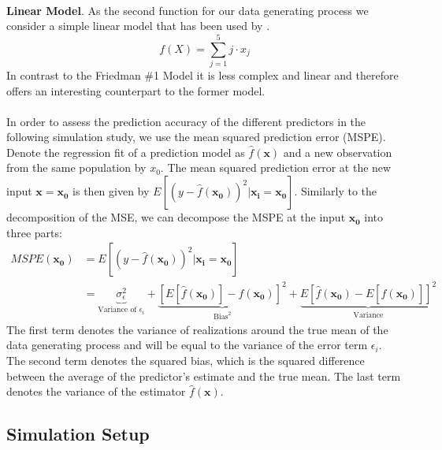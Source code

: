 \\
\textbf{Linear Model}.
As the second function for our data generating process we consider a simple linear model that has been used by \cite{friedman2007}.
$$
f(X) = \sum_{j=1}^{5} j \cdot x_{j}
$$
In contrast to the Friedman \#1 Model it is less complex and linear and therefore offers an interesting counterpart to the former model.\\
\\
In order to assess the prediction accuracy of the different predictors in the following simulation study, we use the mean squared prediction error (MSPE). \newline
Denote the regression fit of a prediction model as $\hat{f}(\mathbf{x})$ and a new observation from the same population by $x_{0}$. The mean squared prediction error at the new input $\mathbf{x} = \mathbf{x_{0}}$ is then given by $E[(y-\hat{f}(\mathbf{x_0}))^2|\mathbf{x_i}=\mathbf{x_0}]$. Similarly to the decomposition of the MSE, we can decompose the MSPE at the input $\mathbf{x_0}$ into three parts:
\begin{align*}
MSPE(\mathbf{x_0}) &= E[(y-\hat{f}(\mathbf{x_0}))^2|\mathbf{x_i}=\mathbf{x_0}]\\
&= \underbrace{\sigma_{\epsilon}^2}_\text{Variance of $\epsilon_{i}$} + \underbrace{[E[\hat{f}(\mathbf{x_0})]-f(\mathbf{x_0})]^2}_{\text{Bias}^2} + \underbrace{E[\hat{f}(\mathbf{x_0}) - E[\hat{f}(\mathbf{x_0})]]^2}_\text{Variance}
\end{align*}
The first term denotes the variance of realizations around the true mean of the data generating process and will be equal to the variance of the error term $\epsilon_{i}$.
The second term denotes the squared bias, which is the squared difference between the average of the predictor's estimate and the true mean. The last term denotes the variance of the estimator  $\hat{f}(\mathbf{x})$.

\subsection{Simulation Setup}\label{sub:simsetup}

